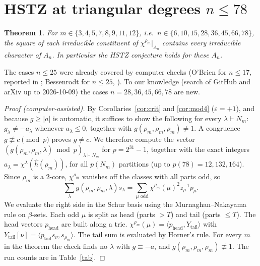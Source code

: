 \documentclass[11pt]{amsart}
\newtheorem{theorem}{Theorem}
\theoremstyle{remark}
\begin{document}
\section{HSTZ at triangular degrees $n\le 78$}

\begin{theorem}\label{thm:main}
For $m\in\{3,4,5,7,8,9,11,12\}$, i.e.\ $n\in\{6,10,15,28,36,45,66,78\}$, the square of each
irreducible constituent of $\chi^{\rho_m}|_{A_n}$ contains every irreducible character of
$A_n$. In particular the HSTZ conjecture holds for these $A_n$.
\end{theorem}

The cases $n\le25$ were already covered by computer checks (O'Brien for $n\le17$, reported
in \cite[Remark 1.3(3)]{HSTZ}; Bessenrodt for $n\le25$, \cite[\S5]{Bes}). To our knowledge
(search of GitHub and arXiv up to 2026-10-09) the cases $n=28,36,45,66,78$ are new.

\begin{proof}[Proof (computer-assisted)]
By Corollaries~\ref{cor:crit} and \ref{cor:mod4} ($\varepsilon=+1$), and because $g\ge|a|$ is
automatic, it suffices to show the following for every $\lambda\vdash N_m$: $g_\lambda\ne
-a_\lambda$ whenever $a_\lambda\le 0$, together with $g(\rho_m,\rho_m,\rho_m)\ne1$. A
congruence $g\not\equiv c\pmod p$ proves $g\neq c$. We therefore compute the vector
$(g(\rho_m,\rho_m,\lambda)\bmod p)_{\lambda\vdash N_m}$ for $p=2^{31}-1$, together with the
exact integers $a_\lambda=\chi^\lambda(\hat h(\rho_m))$, for all $p(N_m)$ partitions (up to
$p(78)=12{,}132{,}164$). Since $\rho_m$ is a $2$-core, $\chi^{\rho_m}$ vanishes off the
classes with all parts odd, so
\[\textstyle\sum_\lambda g(\rho_m,\rho_m,\lambda)s_\lambda=\sum_{\mu\text{ odd}}
\chi^{\rho_m}(\mu)^2 z_\mu^{-1}p_\mu .\]
We evaluate the right side in the Schur basis using the Murnaghan--Nakayama rule on
$\beta$-sets. Each odd $\mu$ is split as head (parts $>T$) and tail (parts $\le T$). The head
vectors $p_{\mathrm{head}}$ are built along a trie. $\chi^{\rho_m}(\mu)=\langle
p_{\mathrm{head}},Y_{\mathrm{tail}}\rangle$ with $Y_{\mathrm{tail}}[\nu]=\langle
p_{\mathrm{tail}}s_\nu,s_{\rho_m}\rangle$. The tail sum is evaluated by Horner's rule. For
every $m$ in the theorem the check finds no $\lambda$ with $g\equiv-a$, and
$g(\rho_m,\rho_m,\rho_m)\not\equiv1$. The run counts are in Table~\ref{tab}.
\end{proof}
\end{document}
